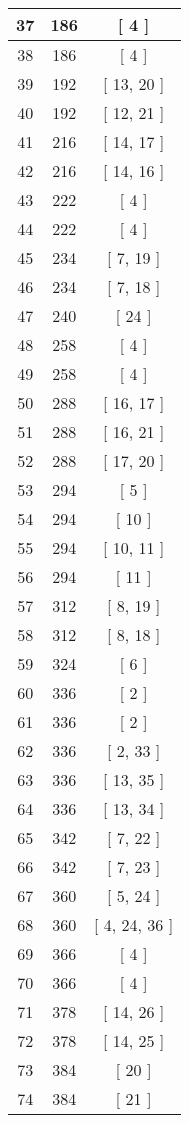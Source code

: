 \begin{center}
\begin{longtable}[H]{|| c c c ||}
37 & 186 & [ 4 ]
\\\hline
38 & 186 & [ 4 ]
\\\hline
39 & 192 & [ 13, 20 ]
\\\hline
40 & 192 & [ 12, 21 ]
\\\hline
41 & 216 & [ 14, 17 ]
\\\hline
42 & 216 & [ 14, 16 ]
\\\hline
43 & 222 & [ 4 ]
\\\hline
44 & 222 & [ 4 ]
\\\hline
45 & 234 & [ 7, 19 ]
\\\hline
46 & 234 & [ 7, 18 ]
\\\hline
47 & 240 & [ 24 ]
\\\hline
48 & 258 & [ 4 ]
\\\hline
49 & 258 & [ 4 ]
\\\hline
50 & 288 & [ 16, 17 ]
\\\hline
51 & 288 & [ 16, 21 ]
\\\hline
52 & 288 & [ 17, 20 ]
\\\hline
53 & 294 & [ 5 ]
\\\hline
54 & 294 & [ 10 ]
\\\hline
55 & 294 & [ 10, 11 ]
\\\hline
56 & 294 & [ 11 ]
\\\hline
57 & 312 & [ 8, 19 ]
\\\hline
58 & 312 & [ 8, 18 ]
\\\hline
59 & 324 & [ 6 ]
\\\hline
60 & 336 & [ 2 ]
\\\hline
61 & 336 & [ 2 ]
\\\hline
62 & 336 & [ 2, 33 ]
\\\hline
63 & 336 & [ 13, 35 ]
\\\hline
64 & 336 & [ 13, 34 ]
\\\hline
65 & 342 & [ 7, 22 ]
\\\hline
66 & 342 & [ 7, 23 ]
\\\hline
67 & 360 & [ 5, 24 ]
\\\hline
68 & 360 & [ 4, 24, 36 ]
\\\hline
69 & 366 & [ 4 ]
\\\hline
70 & 366 & [ 4 ]
\\\hline
71 & 378 & [ 14, 26 ]
\\\hline
72 & 378 & [ 14, 25 ]
\\\hline
73 & 384 & [ 20 ]
\\\hline
74 & 384 & [ 21 ]
\\\hline

\end{longtable}
\end{center}
